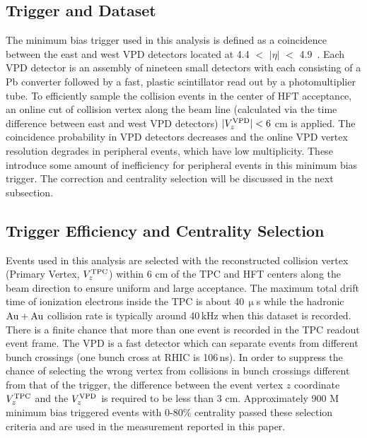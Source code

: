 \documentclass[%
 reprint,	
 amsmath,amssymb,
 aps,
 prc,
]{revtex4-1}
\begin{document}
\subsection{\label{sec:dataset:trigger}Trigger and Dataset}
The minimum bias trigger used in this analysis is defined as a coincidence between the east and west VPD detectors located at 4.4 $<$ $|\eta|$ $<$ 4.9~\cite{VPD}. Each VPD detector is an assembly of nineteen small detectors with each consisting of a Pb converter followed by a fast, plastic scintillator read out by a photomultiplier tube. To efficiently sample the collision events in the center of HFT acceptance, an online cut of collision vertex along the beam line (calculated via the time difference between east and west VPD detectors) $|V_z^{\rm VPD}|<6$ cm is applied. The coincidence probability in VPD detectors decreases and the online VPD vertex resolution degrades in peripheral events, which have low multiplicity. These introduce some amount of inefficiency for peripheral events in this minimum bias trigger. The correction and centrality selection will be discussed in the next subsection.

\subsection{\label{sec:dataset:Centrality}Trigger Efficiency and Centrality Selection}
Events used in this analysis are selected with
the reconstructed collision vertex (Primary Vertex, $V_{z}^{\rm TPC}$) within 6 cm of the TPC and HFT centers along the beam direction to ensure uniform and large acceptance. The maximum total drift time of ionization electrons inside the TPC is about 40\,$\upmu$s while the hadronic ${\rm{Au + Au}}$ collision rate is typically around 40\,kHz when this dataset is recorded. There is a finite chance that more than one event is recorded in the TPC readout event frame. The VPD is a fast detector which can separate events from different bunch crossings (one bunch cross at RHIC is 106\,ns). In order to suppress the chance of selecting the wrong vertex from collisions in bunch crossings different from that of the trigger, the difference between the event vertex $z$ coordinate $V_{z}^{\rm TPC}$ and the $V_{z}^{\rm VPD}$ is required to be less than 3 cm. Approximately 900 M minimum bias triggered events with 0-80\% centrality passed these selection criteria and are used in the measurement reported in this paper.
\end{document}

